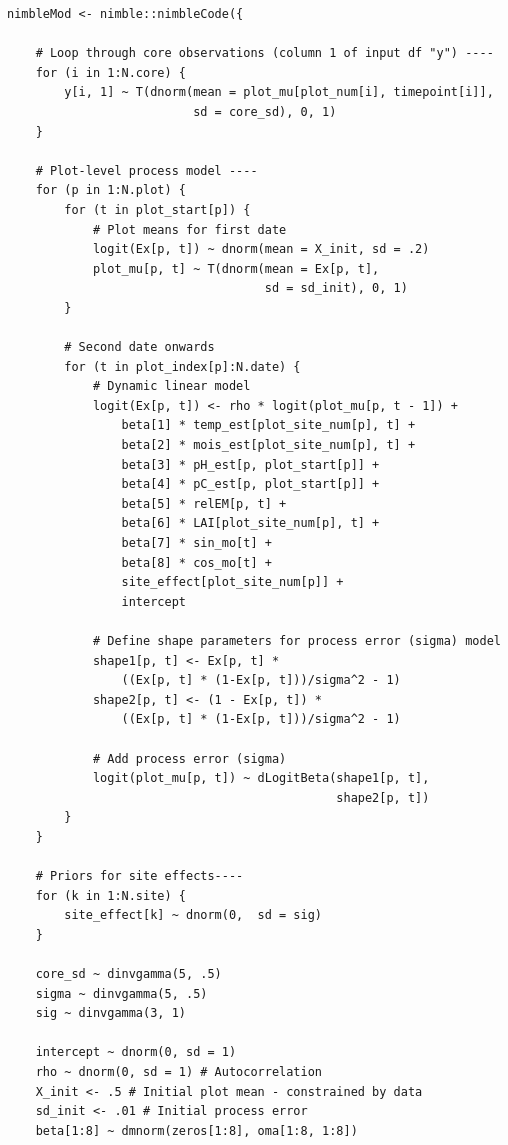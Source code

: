 \documentclass[11pt]{article}
\begin{document}
\begin{lstlisting}
nimbleMod <- nimble::nimbleCode({

    # Loop through core observations (column 1 of input df "y") ----
    for (i in 1:N.core) {
        y[i, 1] ~ T(dnorm(mean = plot_mu[plot_num[i], timepoint[i]],
                          sd = core_sd), 0, 1)
    }

    # Plot-level process model ----
    for (p in 1:N.plot) {
        for (t in plot_start[p]) {
            # Plot means for first date
            logit(Ex[p, t]) ~ dnorm(mean = X_init, sd = .2)
            plot_mu[p, t] ~ T(dnorm(mean = Ex[p, t],
                                    sd = sd_init), 0, 1)
        }

        # Second date onwards
        for (t in plot_index[p]:N.date) {
            # Dynamic linear model
            logit(Ex[p, t]) <- rho * logit(plot_mu[p, t - 1]) +
                beta[1] * temp_est[plot_site_num[p], t] +
                beta[2] * mois_est[plot_site_num[p], t] +
                beta[3] * pH_est[p, plot_start[p]] +
                beta[4] * pC_est[p, plot_start[p]] +
                beta[5] * relEM[p, t] +
                beta[6] * LAI[plot_site_num[p], t] +
                beta[7] * sin_mo[t] +
                beta[8] * cos_mo[t] +
                site_effect[plot_site_num[p]] +
                intercept

            # Define shape parameters for process error (sigma) model
            shape1[p, t] <- Ex[p, t] *
                ((Ex[p, t] * (1-Ex[p, t]))/sigma^2 - 1)
            shape2[p, t] <- (1 - Ex[p, t]) *
                ((Ex[p, t] * (1-Ex[p, t]))/sigma^2 - 1)

            # Add process error (sigma)
            logit(plot_mu[p, t]) ~ dLogitBeta(shape1[p, t],
                                              shape2[p, t])
        }
    }

    # Priors for site effects----
    for (k in 1:N.site) {
        site_effect[k] ~ dnorm(0,  sd = sig)
    }

    core_sd ~ dinvgamma(5, .5)
    sigma ~ dinvgamma(5, .5)
    sig ~ dinvgamma(3, 1)

    intercept ~ dnorm(0, sd = 1)
    rho ~ dnorm(0, sd = 1) # Autocorrelation
    X_init <- .5 # Initial plot mean - constrained by data
    sd_init <- .01 # Initial process error
    beta[1:8] ~ dmnorm(zeros[1:8], oma[1:8, 1:8])


\end{lstlisting}
\end{document}
